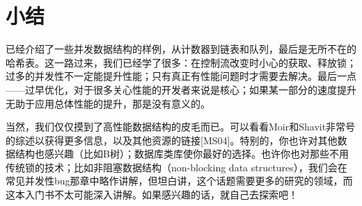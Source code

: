 \section{小结}
已经介绍了一些并发数据结构的样例，从计数器到链表和队列，最后是无所不在的哈希表。这一路过来，我们已经学了很多：在控制流改变时小心的获取、释放锁；过多的并发性不一定能提升性能；只有真正有性能问题时才需要去解决。最后一点——过早优化，对于很多关心性能的开发者来说是核心；如果某一部分的速度提升无助于应用总体性能的提升，那是没有意义的。

当然，我们仅仅摸到了高性能数据结构的皮毛而已。可以看看Moir和Shavit非常号的综述以获得更多信息，以及其他资源的链接[MS04]。特别的，你也许对其他数据结构也感兴趣（比如B树）；数据库类库使你最好的选择。也许你也对那些不用传统锁的技术；比如非阻塞数据结构（non-blocking data structures），我们会在常见并发性bug那章中略作讲解，但坦白讲，这个话题需要更多的研究的领域，而这本入门书不太可能深入讲解。如果感兴趣的话，就自己去探索吧！

